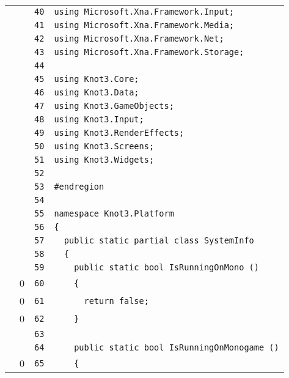 \documentclass[a4paper,10pt]{article}
\begin{document}
\begin{longtable}[l]{lrrl}
\cellcolor{gray} &  & \verb~40~ & \verb~using Microsoft.Xna.Framework.Input;~\\
\cellcolor{gray} &  & \verb~41~ & \verb~using Microsoft.Xna.Framework.Media;~\\
\cellcolor{gray} &  & \verb~42~ & \verb~using Microsoft.Xna.Framework.Net;~\\
\cellcolor{gray} &  & \verb~43~ & \verb~using Microsoft.Xna.Framework.Storage;~\\
\cellcolor{gray} &  & \verb~44~ & \verb~~\\
\cellcolor{gray} &  & \verb~45~ & \verb~using Knot3.Core;~\\
\cellcolor{gray} &  & \verb~46~ & \verb~using Knot3.Data;~\\
\cellcolor{gray} &  & \verb~47~ & \verb~using Knot3.GameObjects;~\\
\cellcolor{gray} &  & \verb~48~ & \verb~using Knot3.Input;~\\
\cellcolor{gray} &  & \verb~49~ & \verb~using Knot3.RenderEffects;~\\
\cellcolor{gray} &  & \verb~50~ & \verb~using Knot3.Screens;~\\
\cellcolor{gray} &  & \verb~51~ & \verb~using Knot3.Widgets;~\\
\cellcolor{gray} &  & \verb~52~ & \verb~~\\
\cellcolor{gray} &  & \verb~53~ & \verb~#endregion~\\
\cellcolor{gray} &  & \verb~54~ & \verb~~\\
\cellcolor{gray} &  & \verb~55~ & \verb~namespace Knot3.Platform~\\
\cellcolor{gray} &  & \verb~56~ & \verb~{~\\
\cellcolor{gray} &  & \verb~57~ & \verb~  public static partial class SystemInfo~\\
\cellcolor{gray} &  & \verb~58~ & \verb~  {~\\
\cellcolor{gray} &  & \verb~59~ & \verb~    public static bool IsRunningOnMono ()~\\
\cellcolor{red} & 0 & \verb~60~ & \verb~    {~\\
\cellcolor{red} & 0 & \verb~61~ & \verb~      return false;~\\
\cellcolor{red} & 0 & \verb~62~ & \verb~    }~\\
\cellcolor{gray} &  & \verb~63~ & \verb~~\\
\cellcolor{gray} &  & \verb~64~ & \verb~    public static bool IsRunningOnMonogame ()~\\
\cellcolor{red} & 0 & \verb~65~ & \verb~    {~\\

\end{longtable}
\end{document}
